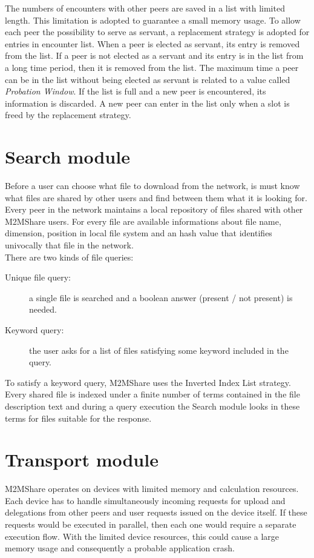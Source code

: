 The numbers of encounters with other peers are saved in a list with limited length. This limitation is adopted to guarantee a small memory usage. To allow each peer the possibility to serve as servant, a replacement strategy is adopted for entries in encounter list. When a peer is elected as servant, its entry is removed from the list. If a peer is not elected as a servant and its entry is in the list from a long time period, then it is removed from the list. The maximum time a peer can be in the list without being elected as servant is related to a value called \textit{Probation Window}. If the list is full and a new peer is encountered, its information is discarded. A new peer can enter in the list only when a slot is freed by the replacement strategy.

\section{Search module}
Before a user can choose what file to download from the network, is must know what files are shared by other users and find between them what it is looking for. Every peer in the network maintains a local repository of files shared with other M2MShare users. For every file are available informations about file name, dimension, position in local file system and an hash value that identifies univocally that file in the network.
\\

There are two kinds of file queries: 

\begin{description}
\item[Unique file query:] a single file is searched and a boolean answer (present / not present) is needed.
\item[Keyword query:] the user asks for a list of files satisfying some keyword included in the query.
\end{description}

To satisfy a keyword query, M2MShare uses the Inverted Index List strategy. Every shared file is indexed under a finite number of terms contained in the file description text and during a query execution the Search module looks in these terms for files suitable for the response.


\section{Transport module}
M2MShare operates on devices with limited memory and calculation resources. Each device has to handle simultaneously incoming requests for upload and delegations from other peers and user requests issued on the device itself. If these requests would be executed in parallel, then each one would require a separate execution flow. With the limited device resources, this could cause a large memory usage and consequently a probable application crash. 
\\

